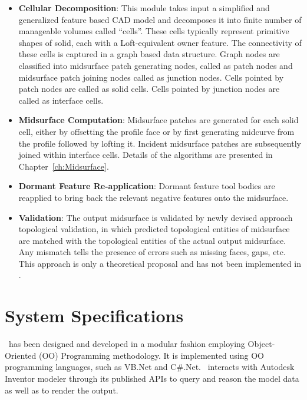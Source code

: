 \begin{itemize}[noitemsep,topsep=2pt,parsep=2pt,partopsep=2pt]
\item \textbf{Cellular Decomposition}: This module takes input a simplified and generalized feature based CAD model and decomposes it into finite number of manageable volumes called ``cells''. These cells typically represent primitive shapes of solid, each with a Loft-equivalent owner feature. The connectivity of these cells is captured in a graph based data structure.  Graph nodes are classified into midsurface patch generating nodes, called as patch nodes and midsurface patch joining nodes called as junction nodes. Cells pointed by patch nodes are called as solid cells. Cells pointed by junction nodes are called as interface cells.

\item \textbf{Midsurface Computation}: Midsurface patches are generated for each solid cell, either by offsetting the profile face or by first generating midcurve from the profile followed by lofting it. Incident midsurface patches are subsequently joined within interface cells. Details of the algorithms are presented in Chapter~\ref{ch:Midsurface}.


\item \textbf{Dormant Feature Re-application}: Dormant feature tool bodies are reapplied to bring back the relevant negative features onto the midsurface. 

\item \textbf{Validation}: The output midsurface is validated by newly devised approach topological validation, in which predicted topological entities of midsurface are matched with the topological entities of the actual output midsurface. Any mismatch tells the presence of errors such as missing faces, gaps, etc. This approach is only a theoretical proposal and has not been  implemented in \mysystemname.
\end{itemize}

\section{System Specifications} \label{sec:proposal:sysspecs}

\mysystemname~has been designed and developed in a modular fashion employing Object-Oriented (OO) Programming  methodology. It is implemented using OO programming languages, such as VB.Net and C\#.Net. \mysystemname~interacts with Autodesk Inventor modeler through its published APIs to query and reason the model data as well as to render the output. 

